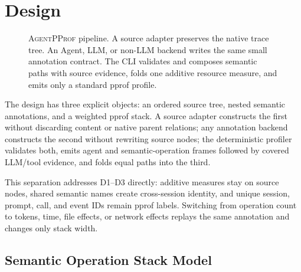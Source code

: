 \documentclass[letterpaper]{article}
\newcommand{\sys}{\textsc{AgentPProf}\xspace}
\providecommand{\Description}[1]{}
\begin{document}
\section{Design}
\label{sec:design}

\begin{figure}[t]
\centering

\caption{\sys pipeline. A source adapter preserves the native trace tree. An
Agent, LLM, or non-LLM backend writes the same small annotation contract. The
CLI validates and composes semantic paths with source evidence, folds one
additive resource measure, and emits only a standard pprof profile.}
\Description{A source adapter builds a session, prompt, LLM-call, and tool-call
tree. An interchangeable backend produces semantic annotations. The CLI
validates, composes, folds, and exports a pprof protobuf profile.}
\label{fig:architecture}
\end{figure}

The design has three explicit objects: an ordered source tree, nested semantic
annotations, and a weighted pprof stack. A source adapter constructs the first
without discarding content or native parent relations; any annotation backend
constructs the second without rewriting source nodes; the deterministic
profiler validates both, emits agent and semantic-operation frames followed by
covered LLM/tool evidence, and folds equal paths into the third.

This separation addresses D1--D3 directly: additive measures stay on source
nodes, shared semantic names create cross-session identity, and unique session,
prompt, call, and event IDs remain pprof labels. Switching from operation count
to tokens, time, file effects, or network effects replays the same annotation
and changes only stack width.

\subsection{Semantic Operation Stack Model}
\label{sec:ops}
\end{document}
